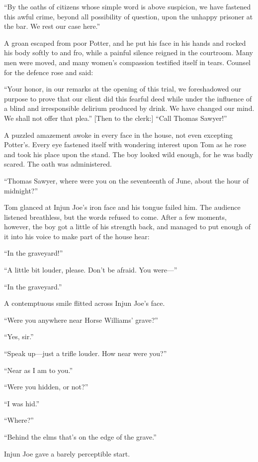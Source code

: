 \documentclass{book}
\begin{document}
“By the oaths of citizens whose simple word is above suspicion, we have fastened this awful crime, beyond all possibility of question, upon the unhappy prisoner at the bar. We rest our case here.”

A groan escaped from poor Potter, and he put his face in his hands and rocked his body softly to and fro, while a painful silence reigned in the courtroom. Many men were moved, and many women’s compassion testified itself in tears. Counsel for the defence rose and said:

“Your honor, in our remarks at the opening of this trial, we foreshadowed our purpose to prove that our client did this fearful deed while under the influence of a blind and irresponsible delirium produced by drink. We have changed our mind. We shall not offer that plea.” [Then to the clerk:] “Call Thomas Sawyer!”

A puzzled amazement awoke in every face in the house, not even excepting Potter’s. Every eye fastened itself with wondering interest upon Tom as he rose and took his place upon the stand. The boy looked wild enough, for he was badly scared. The oath was administered.

“Thomas Sawyer, where were you on the seventeenth of June, about the hour of midnight?”

Tom glanced at Injun Joe’s iron face and his tongue failed him. The audience listened breathless, but the words refused to come. After a few moments, however, the boy got a little of his strength back, and managed to put enough of it into his voice to make part of the house hear:

“In the graveyard!”

“A little bit louder, please. Don’t be afraid. You were—”

“In the graveyard.”

A contemptuous smile flitted across Injun Joe’s face.

“Were you anywhere near Horse Williams’ grave?”

“Yes, sir.”

“Speak up—just a trifle louder. How near were you?”

“Near as I am to you.”

“Were you hidden, or not?”

“I was hid.”

“Where?”

“Behind the elms that’s on the edge of the grave.”

Injun Joe gave a barely perceptible start.
\end{document}
